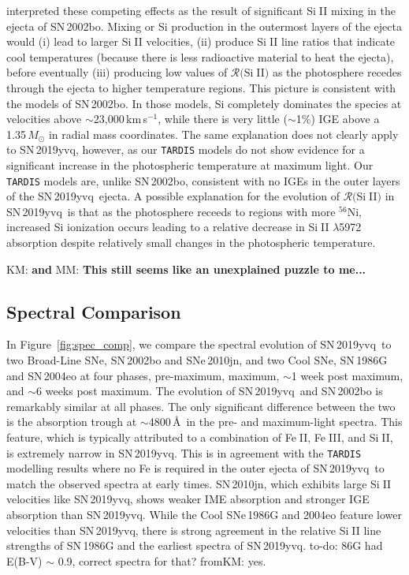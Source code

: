 \documentclass[twocolumn]{aastex63}
\def\ion#1#2{#1$\;${\footnotesize\rm{#2}}\relax}
\newcommand{\kate}[1]{{\color{red} KM: \textbf{#1}}}
\newcommand{\magee}[1]{{\color{Rust} MM: \textbf{#1}}}
\newcommand{\fromkate}[1]{{\color{brown} fromKM: {#1}}}
\newcommand{\todo}[1]{{\color{magenta} to-do: {#1}}}
\newcommand{\kms}{km\,s$^{-1}$}
\newcommand{\radni}{$^{56}$Ni}
\newcommand{\sn}{SN\,2019yvq}
\begin{document}
\citet{Benetti04} interpreted these competing effects as the result of
significant \ion{Si}{II} mixing in the ejecta of SN\,2002bo. Mixing or Si
production in the outermost layers of the ejecta would (i) lead to larger
\ion{Si}{II} velocities, (ii) produce \ion{Si}{II} line ratios that indicate
cool temperatures (because there is less radioactive material to heat the
ejecta), before eventually (iii) producing low values of
$\mathcal{R}($\ion{Si}{II}$)$ as the photosphere recedes through the ejecta to
higher temperature regions. This picture is consistent with the
\citet{Stehle05} models of SN\,2002bo. In those models, Si completely
dominates the species at velocities above $\sim$23,000\,\kms, while there is
very little ($\sim$1\%) IGE above a 1.35\,$M_\odot$ in radial mass
coordinates. The same explanation does not clearly apply to \sn, however, as
our \texttt{TARDIS} models do not show evidence for a significant increase in
the photospheric temperature at maximum light. Our \texttt{TARDIS} models are,
unlike SN\,2002bo, consistent with no IGEs in the outer layers of the \sn\
ejecta. A possible explanation for the evolution of
$\mathcal{R}($\ion{Si}{II}$)$ in \sn\ is that as the photosphere receeds to
regions with more \radni, increased Si ionization occurs leading to a relative
decrease in \ion{Si}{II} $\lambda$5972 absorption despite relatively small
changes in the photospheric temperature.

\kate{and} \magee{This still seems like an unexplained puzzle to me...}

\subsection{Spectral Comparison}\label{sec:spec_comp}

In Figure~\ref{fig:spec_comp}, we compare the spectral evolution of \sn\ to
two Broad-Line SNe, SN\,2002bo and SNe\,2010jn, and two Cool SNe, SN\,1986G
and SN\,2004eo \citep{Cristiani92,
Benetti04,Pastorello07,Silverman11,Hachinger13,Maguire14} at four phases,
pre-maximum, maximum, $\sim$1 week post maximum, and $\sim$6 weeks post
maximum. The evolution of \sn\ and SN\,2002bo is remarkably similar at all
phases. The only significant difference between the two is the absorption
trough at $\sim$4800\,\AA\ in the pre- and maximum-light spectra. This
feature, which is typically attributed to a combination of \ion{Fe}{II},
\ion{Fe}{III}, and \ion{Si}{II}, is extremely narrow in \sn. This is in
agreement with the \texttt{TARDIS} modelling results where no Fe is required
in the outer ejecta of \sn\ to match the observed spectra at early times.
SN\,2010jn, which exhibits large \ion{Si}{II} velocities like \sn, shows
weaker IME absorption and stronger IGE absorption than \sn. While the
\citeauthor{Branch06}Cool SNe\,1986G and 2004eo feature lower velocities than
\sn, there is strong agreement in the relative \ion{Si}{II} line strengths of
SN\,1986G and the earliest spectra of \sn. \todo{86G had E(B-V) $\sim$ 0.9,
correct spectra for that?} \fromkate{yes.}
\end{document}
